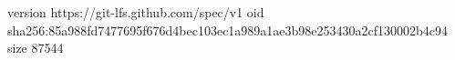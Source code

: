 version https://git-lfs.github.com/spec/v1
oid sha256:85a988fd7477695f676d4bec103ec1a989a1ae3b98e253430a2cf130002b4c94
size 87544
